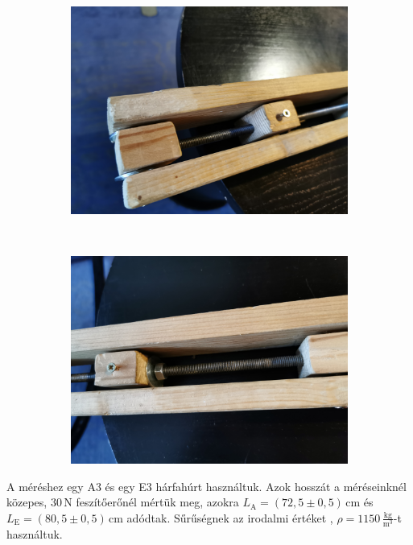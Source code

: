 \documentclass[a4paper,12pt]{article}
\newcommand{\kgm}{\frac{\mathrm{kg}}{\mathrm{m}^3}}
\begin{document}
\begin{figure}[h!]
\centering
\begin{subfigure}[t]{.4\linewidth}
\centering
\includegraphics[width=\linewidth]{vegekozel.jpg}
\end{subfigure}%
~~
\begin{subfigure}[t]{.4\linewidth}
\includegraphics[width=\linewidth]{vegekozel2.jpg}
\end{subfigure}
\caption{}
\label{menetes}
\end{figure}

A méréshez egy A3 és egy E3 hárfahúrt használtuk. Azok hosszát a méréseinknél közepes, $30$\,N feszítőerőnél mértük meg, azokra $L_\text{A} = (72,5 \pm 0,5)$\,cm és $L_\text{E} = (80,5 \pm 0,5)$\,cm adódtak. Sűrűségnek az irodalmi értéket \cite{hur_surusegek}, $\rho = 1150$\,$\kgm$-t használtuk.
\end{document}
